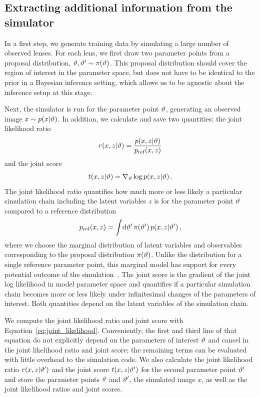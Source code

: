 \documentclass[twocolumn]{aastex63}
\begin{document}
\subsection{Extracting additional information from the simulator}
\label{sec:lfi-gold}

In a first step, we generate training data by simulating a large number of observed lenses. For each lens, we first draw two parameter points from a proposal distribution, $\vartheta, \vartheta' \sim \pi(\vartheta)$. This proposal distribution should cover the region of interest in the parameter space, but does not have to be identical to the prior in a Bayesian inference setting, which allows us to be agnostic about the inference setup at this stage.

Next, the simulator is run for the parameter point $\vartheta$, generating an observed image $x \sim p(x|\vartheta)$. In addition, we calculate and save two quantities: the joint likelihood ratio
%
\begin{equation}
  r(x,z | \stattheta) = \frac {p(x,z | \stattheta)} {p_\mathrm{ref}(x,z)}
\end{equation}
%
and the joint score
%
\begin{equation}
  t(x, z | \stattheta) = \nabla_{\stattheta} \log p(x,z | \stattheta) \,.
\end{equation}
%
The joint likelihood ratio quantifies how much more or less likely a particular simulation chain including the latent variables $z$ is for the parameter point $\vartheta$ compared to a reference distribution
%
\begin{equation}
  \pref(x,z) = \int\!\diff\stattheta' \, \pi(\stattheta') \, p(x,z | \stattheta') \,,
\end{equation}
%
where we choose the marginal distribution of latent variables and observables corresponding to the proposal distribution $\pi(\vartheta)$. Unlike the distribution for a single reference parameter point, this marginal model has support for every potential outcome of the simulation~\citep{Hermans:2019ioj}. The joint score is the gradient of the joint log likelihood in model parameter space and quantifies if a particular simulation chain becomes more or less likely under infinitesimal changes of the parameters of interest. Both quantities depend on the latent variables of the simulation chain.

We compute the joint likelihood ratio and joint score with Equation~\eqref{eq:joint_likelihood}. Conveniently, the first and third line of that equation do not explicitly depend on the parameters of interest $\vartheta$ and cancel in the joint likelihood ratio and joint score; the remaining terms can be evaluated with little overhead to the simulation code. We also calculate the joint likelihood ratio $r(x,z|\vartheta')$ and the joint score $t(x,z|\vartheta')$ for the second parameter point $\vartheta'$ and store the parameter points $\vartheta$ and $\vartheta'$, the simulated image $x$, as well as the joint likelihood ratios and joint scores.
\end{document}
